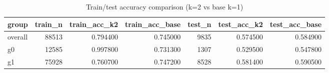 \begin{table}
\caption{Train/test accuracy comparison (k=2 vs base k=1)}
\label{tab:accuracy_k2}
\begin{tabular}{lrrrrrr}
\toprule
group & train_n & train_acc_k2 & train_acc_base & test_n & test_acc_k2 & test_acc_base \\
\midrule
overall & 88513 & 0.794400 & 0.745000 & 9835 & 0.574500 & 0.584900 \\
g0 & 12585 & 0.997800 & 0.731300 & 1307 & 0.529500 & 0.547800 \\
g1 & 75928 & 0.760700 & 0.747200 & 8528 & 0.581400 & 0.590500 \\
\bottomrule
\end{tabular}
\end{table}

